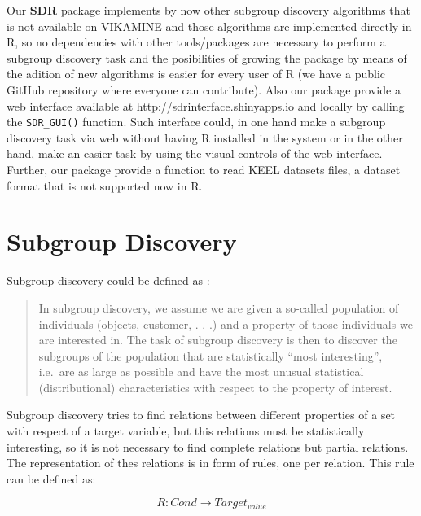 \documentclass[]{article}
\begin{document}
Our \textbf{SDR} package implements by now other subgroup discovery
algorithms that is not available on VIKAMINE and those algorithms are
implemented directly in R, so no dependencies with other tools/packages
are necessary to perform a subgroup discovery task and the posibilities
of growing the package by means of the adition of new algorithms is
easier for every user of R (we have a public GitHub repository where
everyone can contribute). Also our package provide a web interface
available at http://sdrinterface.shinyapps.io and locally by calling the
\texttt{SDR\_GUI()} function. Such interface could, in one hand make a
subgroup discovery task via web without having R installed in the system
or in the other hand, make an easier task by using the visual controls
of the web interface.\\Further, our package provide a function to read
KEEL \cite{keel} datasets files, a dataset format that is not supported
now in R.

\section{Subgroup Discovery}\label{subgroup-discovery}

Subgroup discovery could be defined as \cite{definicionSD}:

\begin{quote}
In subgroup discovery, we assume we are given a so-called population of
individuals (objects, customer, . . .) and a property of those
individuals we are interested in. The task of subgroup discovery is then
to discover the subgroups of the population that are statistically
``most interesting'', i.e.~are as large as possible and have the most
unusual statistical (distributional) characteristics with respect to the
property of interest.
\end{quote}

Subgroup discovery tries to find relations between different properties
of a set with respect of a target variable, but this relations must be
statistically interesting, so it is not necessary to find complete
relations but partial relations.\\The representation of thes relations
is in form of rules, one per relation. This rule can be defined as:

\begin{equation} R: Cond \rightarrow Target_{value} \end{equation}
\end{document}
